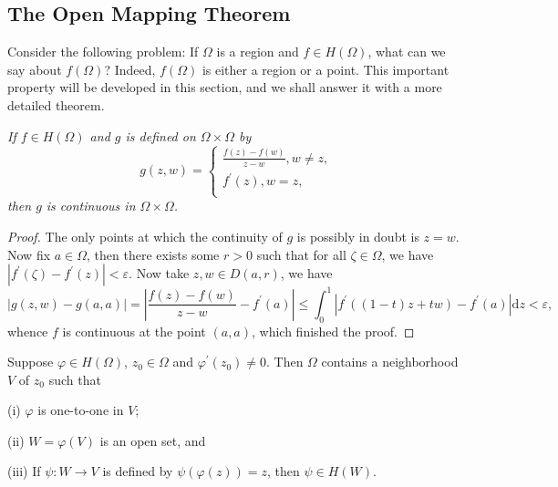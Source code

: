 \subsection{The Open Mapping Theorem}
Consider the following problem: If $\Omega$ is a region and $f\in H(\Omega)$, what can we say about $f(\Omega)$? Indeed, $f(\Omega)$ is either a region or a point. This important property will be developed in this section, and we shall answer it with a more detailed theorem.
\begin{lemma}\em
If $f\in H(\Omega)$ and $g$ is defined on $\Omega\times\Omega$ by 
$$
g\left( z,w \right) =\begin{cases}
	\frac{f\left( z \right) -f\left( w \right)}{z-w},w\ne z,\\
	f^{\prime}\left( z \right) ,w=z,\\
\end{cases}
$$
then $g$ is continuous in $\Omega\times\Omega$.
\end{lemma}
\begin{proof}
The only points at which the continuity of $g$ is possibly in doubt is $z=w$. Now fix $a\in\Omega$, then there exists some $r>0$ such that for all $\zeta\in\Omega$, we have $|f^\prime(\zeta)-f^\prime(z)|<\varepsilon$. Now take $z,w\in D(a,r)$, we have 
$$
\left| g\left( z,w \right) -g\left( a,a \right) \right|=\left| \frac{f\left( z \right) -f\left( w \right)}{z-w}-f^{\prime}\left( a \right) \right|\le \int_0^1{\left| f^{\prime}\left( \left( 1-t \right) z+tw \right) -f^{\prime}\left( a \right) \right|\mathrm{d}z}<\varepsilon ,
$$
whence $f$ is continuous at the point $(a,a)$, which finished the proof.
\end{proof}
\begin{theorem}
Suppose $\varphi\in H(\Omega)$, $z_0\in\Omega$ and $\varphi^\prime(z_0)\ne 0$. Then $\Omega$ contains a neighborhood $V$ of $z_0$ such that \par
(i) $\varphi$ is one-to-one in $V$;\par
(ii) $W=\varphi(V)$ is an open set, and \par
(iii) If $\psi:W\to V$ is defined by $\psi(\varphi(z))=z$, then $\psi\in H(W)$.
\end{theorem}
